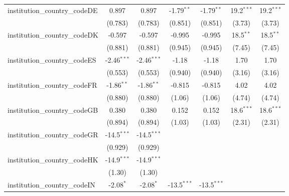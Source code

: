 \begin{tabular}{lcccccc}
   institution\_country\_codeDE          & 0.897         & 0.897         & -1.79$^{**}$  & -1.79$^{**}$  & 19.2$^{***}$  & 19.2$^{***}$\\   
                                         & (0.783)       & (0.783)       & (0.851)       & (0.851)       & (3.73)        & (3.73)\\   
   institution\_country\_codeDK          & -0.597        & -0.597        & -0.995        & -0.995        & 18.5$^{**}$   & 18.5$^{**}$\\   
                                         & (0.881)       & (0.881)       & (0.945)       & (0.945)       & (7.45)        & (7.45)\\   
   institution\_country\_codeES          & -2.46$^{***}$ & -2.46$^{***}$ & -1.18         & -1.18         & 1.70          & 1.70\\   
                                         & (0.553)       & (0.553)       & (0.940)       & (0.940)       & (3.16)        & (3.16)\\   
   institution\_country\_codeFR          & -1.86$^{**}$  & -1.86$^{**}$  & -0.815        & -0.815        & 4.02          & 4.02\\   
                                         & (0.880)       & (0.880)       & (1.06)        & (1.06)        & (4.74)        & (4.74)\\   
   institution\_country\_codeGB          & 0.380         & 0.380         & 0.152         & 0.152         & 18.6$^{***}$  & 18.6$^{***}$\\   
                                         & (0.894)       & (0.894)       & (1.03)        & (1.03)        & (2.31)        & (2.31)\\   
   institution\_country\_codeGR          & -14.5$^{***}$ & -14.5$^{***}$ &               &               &               &   \\   
                                         & (0.929)       & (0.929)       &               &               &               &   \\   
   institution\_country\_codeHK          & -14.9$^{***}$ & -14.9$^{***}$ &               &               &               &   \\   
                                         & (1.30)        & (1.30)        &               &               &               &   \\   
   institution\_country\_codeIN          & -2.08$^{*}$   & -2.08$^{*}$   & -13.5$^{***}$ & -13.5$^{***}$ &               &   \\   

\end{tabular}
